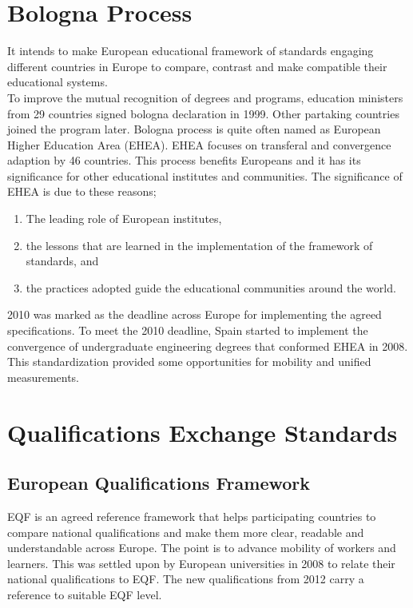 \documentclass[12pt,a4paper,oneside]{book}
\begin{document}
\section{Bologna Process}

It intends to make European educational framework of standards engaging different countries in Europe to compare, contrast and make compatible their educational systems. \cite{bologna process} \\

To improve the mutual recognition of degrees and programs, education ministers from 29 countries signed bologna declaration in 1999. Other partaking countries joined the program later. \cite{improvement bologna process} Bologna process is quite often named as European Higher Education Area (EHEA). EHEA focuses on transferal and convergence adaption by 46 countries. This process benefits Europeans and it has its significance for other educational institutes and communities. The significance of EHEA is due to these reasons;

	\begin{enumerate}

		\item The leading role of European institutes,

		\item the lessons that are learned in the implementation of the framework of standards, and
	
		\item the practices adopted guide the educational communities around the world.

	\end{enumerate} 

	2010 was marked as the deadline across Europe for implementing the agreed specifications. \cite{EHEA} To meet the 2010 deadline, Spain started to implement the convergence of undergraduate engineering degrees that conformed EHEA in 2008. This standardization provided some opportunities for mobility and unified measurements. \cite{EHEA}

\section{Qualifications Exchange Standards}

    \subsection{European Qualifications Framework}
    EQF is an agreed reference framework that helps participating countries to compare national qualifications and make them more clear, readable and understandable across Europe. The point is to advance mobility of workers and learners. This was settled upon by European universities in 2008 to relate their national qualifications to EQF. The new qualifications from 2012 carry a reference to suitable EQF level. \\
\end{document}
